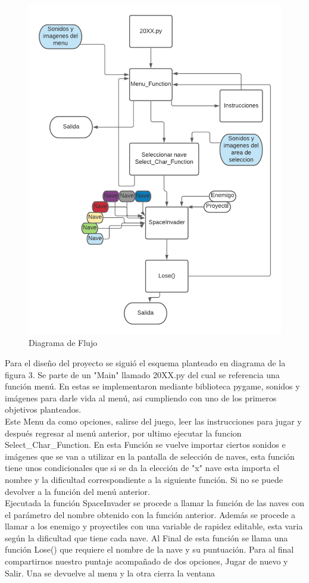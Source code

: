\documentclass[12pt,letterpaper]{article}
\begin{document}
\begin{figure}[H]
\centering
\includegraphics[width=16cm]{Blank diagram.png}
\caption{Diagrama de Flujo}
\end{figure}
Para el diseño del proyecto se siguió el esquema planteado en diagrama de la figura 3. Se parte de un "Main" llamado 20XX.py del cual se referencia una función menú. En estas se implementaron mediante biblioteca pygame, sonidos y imágenes para darle vida al menú, asi cumpliendo con uno de los primeros objetivos planteados.
\vspace{5mm}\\
\indent Este Menu da como opciones, salirse del juego, leer las instrucciones para jugar y después regresar al menú anterior, por ultimo ejecutar la funcion Select\_Char\_Function. En esta Función se vuelve importar ciertos sonidos e imágenes que se van a utilizar en la pantalla de selección de naves, esta función tiene unos condicionales que si se da la elección de "x" nave esta importa el nombre y la dificultad correspondiente a la siguiente función. Si no se puede devolver a la función del menú anterior.\vspace{5mm}\\
\indent Ejecutada la función SpaceInvader se procede a llamar la función de las naves con el parámetro del nombre obtenido con la función anterior. Además se procede a llamar a los enemigo y proyectiles con una variable de rapidez editable, esta varia según la dificultad que tiene cada nave. Al Final de esta función se llama una función Lose() que requiere el nombre de la nave y su puntuación. Para al final compartirnos nuestro puntaje acompañado de dos opciones, Jugar de nuevo y Salir. Una se devuelve al menu y la otra cierra la ventana 
\end{document}
